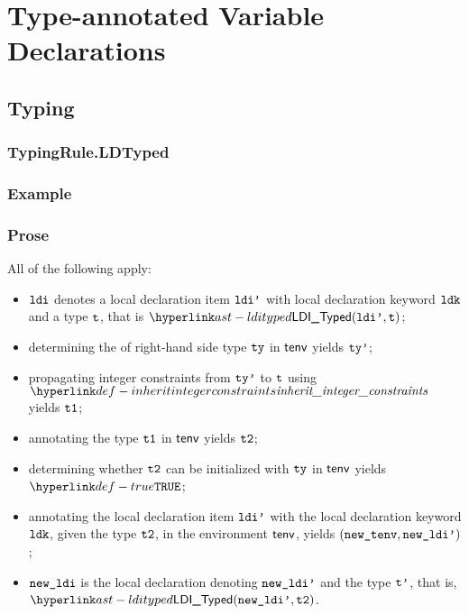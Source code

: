 \section{Type-annotated Variable Declarations\label{sec:TypeAnnotatedVariableDeclarations}}
\subsection{Typing}
\subsubsection{TypingRule.LDTyped\label{sec:TypingRule.LDTyped}}
\subsubsection{Example}

\subsubsection{Prose}
All of the following apply:
\begin{itemize}
  \item $\texttt{ldi}$ denotes a local declaration item $\texttt{ldi'}$ with local declaration keyword $\texttt{ldk}$
  and a type $\texttt{t}$, that is $\LDITyped(\ldip, \vt)$;
  \item determining the \structure{} of right-hand side type $\texttt{ty}$ in $\textsf{tenv}$ yields $\texttt{ty'}$;
  \item propagating integer constraints from $\texttt{ty'}$ to $\texttt{t}$ using $\inheritintegerconstraints$ yields $\texttt{t1}$;
  \item annotating the type $\texttt{t1}$ in $\textsf{tenv}$ yields $\texttt{t2}$\ProseOrTypeError;
  \item determining whether $\texttt{t2}$ can be initialized with $\texttt{ty}$ in $\textsf{tenv}$ yields $\True$\ProseOrTypeError;
  \item annotating the local declaration item $\texttt{ldi'}$ with the local declaration keyword $\texttt{ldk}$, given
  the type $\texttt{t2}$, in the environment $\textsf{tenv}$, yields $(\texttt{new\_tenv},\texttt{new\_ldi'})$;
  \item $\texttt{new\_ldi}$ is the local declaration denoting $\texttt{new\_ldi'}$ and the type $\texttt{t'}$, that is, \\
  $\LDITyped(\newldip, \vttwo)$.
\end{itemize}
